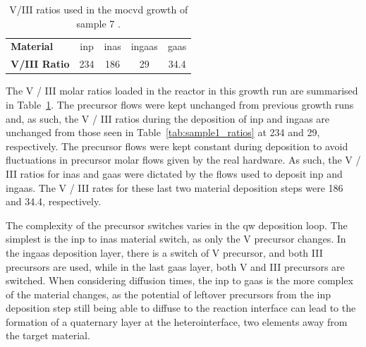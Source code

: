 \begin{table}
  \centering
  \caption[V/III ratios used in the \acs{mocvd} growth of sample 7.]{V/III ratios used in the \acs{mocvd} growth of sample 7 \cite{Brugnolotto2023_2}.}
  \label{tbl:s7_ratios}
  \begin{tabular}{l|cccc}
    \textbf{Material}    & \acs{inp}  & \acs{inas} & \acs{ingaas}   & \acs{gaas} \\
    \textbf{V/III Ratio} & \num{234} & \num{186} & \num{29}      & \num{34.4}  \\
    \hline \hline
  \end{tabular}
\end{table}

The V / III molar ratios loaded in the reactor in this growth run are summarised in Table~\ref{tbl:s7_ratios}. The precursor flows were kept unchanged from previous growth runs and, as such, the V / III ratios during the deposition of \acs{inp} and \acs{ingaas} are unchanged from those seen in Table~\ref{tab:sample1_ratios} at \num{234} and \num{29}, respectively. The precursor flows were kept constant during deposition to avoid fluctuations in precursor molar flows given by the real hardware. As such, the V / III ratios for \acs{inas} and \acs{gaas} were dictated by the flows used to deposit \acs{inp} and \acs{ingaas}. The V / III rates for these last two material deposition steps were \num{186} and \num{34.4}, respectively. 

The complexity of the precursor switches varies in the \acl{qw} deposition loop. The simplest is the \acs{inp} to \acs{inas} material switch, as only the V precursor changes. In the \acs{ingaas} deposition layer, there is a switch of V precursor, and both III precursors are used, while in the last \acs{gaas} layer, both V and III precursors are switched. When considering diffusion times, the \acs{inp} to \acs{gaas} is the more complex of the material changes, as the potential of leftover precursors from the \acs{inp} deposition step still being able to diffuse to the reaction interface can lead to the formation of a quaternary  layer at the heterointerface, two elements away from the target material.

